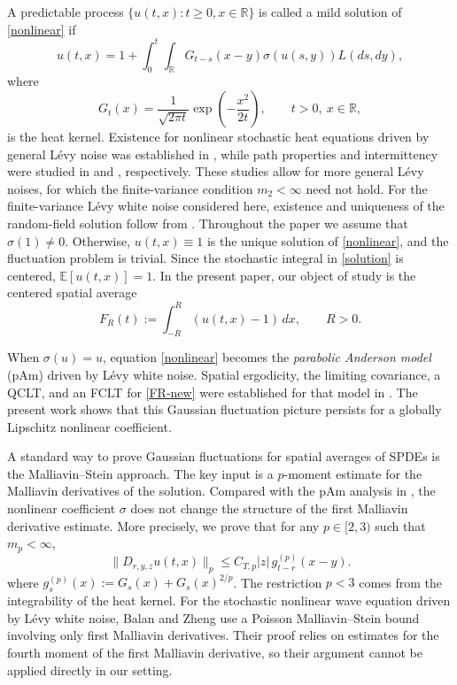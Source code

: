 \documentclass[12pt]{article}
\def\bE{\mathbb{E}}
\def\bR{\mathbb{R}}
\begin{document}
\medskip


\medskip

A predictable process $\{u(t,x):t\ge0,x\in\bR\}$ is called a mild solution of
\eqref{nonlinear} if
\begin{equation}
\label{solution}
u(t,x)
=
1+
\int_0^t\int_{\bR}
G_{t-s}(x-y)\sigma(u(s,y))L(ds,dy),
\end{equation}
where
\[
G_t(x)
=
\frac{1}{\sqrt{2\pi t}}
\exp\left(-\frac{x^2}{2t}\right),
\qquad t>0,\ x\in\bR,
\]
is the heat kernel. Existence for nonlinear stochastic heat equations driven by general
L\'evy noise was established in \cite{C17}, while path properties and
intermittency were studied in \cite{CDH19} and \cite{CK19}, respectively.
 These studies allow for more general L\'evy noises, for which the
finite-variance condition $m_2<\infty$ need not hold. For the finite-variance L\'evy white noise considered here, existence
and uniqueness of the random-field solution follow from
\cite{BN17}.
Throughout the paper we assume that $\sigma(1)\neq0$.
Otherwise, $u(t,x)\equiv1$ is the unique solution of
\eqref{nonlinear}, and the fluctuation problem is trivial. Since the stochastic integral in \eqref{solution} is centered,
$\bE[u(t,x)]=1$.
In the present paper,  our object of study is the centered spatial average
\begin{equation}
\label{FR-new}
F_R(t)
:=
\int_{-R}^{R}(u(t,x)-1)\,dx,
\qquad R>0.
\end{equation}


\medskip


When $\sigma(u)=u$, equation \eqref{nonlinear} becomes the
{\em parabolic Anderson model} (pAm) driven by L\'evy white noise. Spatial ergodicity, the limiting
covariance, a QCLT, and an FCLT for \eqref{FR-new} were established for that
model in \cite{BLW26}. The present work shows that this Gaussian fluctuation
picture persists for a globally Lipschitz nonlinear coefficient.



\medskip



A standard way to prove Gaussian fluctuations for spatial averages of SPDEs is
the Malliavin--Stein approach.  The key input  is a
$p$-moment estimate for the Malliavin derivatives of the solution.
Compared with the pAm analysis in \cite{BLW26}, the nonlinear coefficient
$\sigma$ does not change the structure of the first Malliavin derivative
estimate. More precisely, we prove that for any $p\in[2,3)$ such that
$m_p<\infty$,
\begin{equation}
\label{Du}
\big\|D_{r,y,z}u(t,x)\big\|_p
\le
C_{T,p}|z|\,g_{t-r}^{(p)}(x-y).
\end{equation}
 where $g_s^{(p)}(x)
:=
G_s(x)+G_s(x)^{2/p}$. The restriction $p<3$ comes from the integrability of the heat
kernel. For the stochastic nonlinear wave equation driven by
L\'evy white noise, Balan and Zheng \cite{BZ26} use a Poisson
Malliavin--Stein bound involving only first Malliavin derivatives.
Their proof relies on estimates for the fourth moment of the
first Malliavin derivative, so their argument cannot be applied
directly in our setting.
\end{document}
